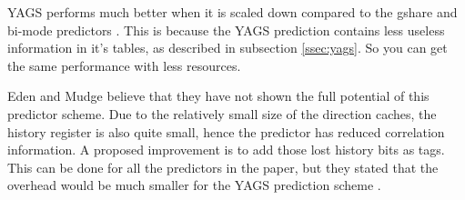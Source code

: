 YAGS performs much better when it is scaled down compared to the gshare and bi-mode predictors \cite{yags}.
This is because the YAGS prediction contains less useless information in it's tables, as described in subsection \ref{ssec:yags}.
So you can get the same performance with less resources.

Eden and Mudge believe that they have not shown the full potential of this predictor scheme.
Due to the relatively small size of the direction caches, the history register is also quite small, hence the predictor has reduced correlation information.
A proposed improvement is to add those lost history bits as tags.
This can be done for all the predictors in the paper, but they stated that the overhead would be much smaller for the YAGS prediction scheme \cite{yags}. 
